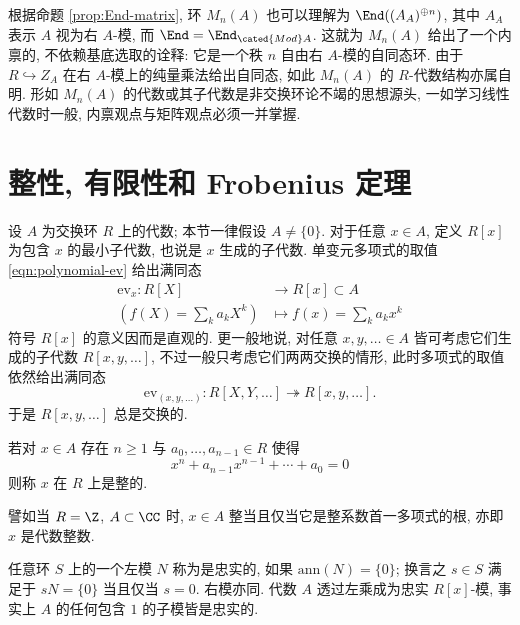 根据命题 \ref{prop:End-matrix}, 环 $M_n(A)$ 也可以理解为 $\End((A_A)^{\oplus n})$, 其中 $A_A$ 表示 $A$ 视为右 $A$-模, 而 $\End = \End_{\cated{Mod}A}$. 这就为 $M_n(A)$ 给出了一个内禀的, 不依赖基底选取的诠释: 它是一个秩 $n$ 自由右 $A$-模的自同态环. 由于 $R \hookrightarrow Z_A$ 在右 $A$-模上的纯量乘法给出自同态, 如此 $M_n(A)$ 的 $R$-代数结构亦属自明. 形如 $M_n(A)$ 的代数或其子代数是非交换环论不竭的思想源头, 一如学习线性代数时一般, 内禀观点与矩阵观点必须一并掌握.

\section{整性, 有限性和 Frobenius 定理}\label{sec:integrality-finiteness}
设 $A$ 为交换环 $R$ 上的代数; 本节一律假设 $A \neq \{0\}$. 对于任意 $x \in A$, 定义 $R[x]$ 为包含 $x$ 的最小子代数, 也说是 $x$ 生成的子代数. 单变元多项式的取值 \eqref{eqn:polynomial-ev} 给出满同态 
\begin{align*}
	\text{ev}_x: R[X] & \longrightarrow R[x] \subset A \\
	\left( f(X) = \sum_k a_k X^k \right) & \longmapsto f(x) = \sum_k a_k x^k 
\end{align*}
符号 $R[x]$ 的意义因而是直观的. 更一般地说, 对任意 $x,y, \ldots \in A$ 皆可考虑它们生成的子代数 $R[x,y, \ldots]$, 不过一般只考虑它们两两交换的情形, 此时多项式的取值依然给出满同态
\[ \text{ev}_{(x,y, \ldots)}: R[X, Y, \ldots] \twoheadrightarrow R[x,y,\ldots]. \]
于是 $R[x,y, \ldots]$ 总是交换的.

\begin{definition}[整性]\label{def:integrality}
	若对 $x \in A$ 存在 $n \geq 1$ 与 $a_0, \ldots, a_{n-1} \in R$ 使得
	\begin{equation}\label{eqn:integrality}
		x^n + a_{n-1} x^{n-1} + \cdots + a_0 = 0
	\end{equation}
	则称 $x$ 在 $R$ 上是整的.
\end{definition}
譬如当 $R=\Z$, $A \subset \CC$ 时, $x \in A$ 整当且仅当它是整系数首一多项式的根, 亦即 $x$ 是代数整数.

任意环 $S$ 上的一个左模 $N$ 称为是忠实的, 如果 $\text{ann}(N) = \{0\}$; 换言之 $s \in S$ 满足于 $sN=\{0\}$ 当且仅当 $s=0$. 右模亦同. 代数 $A$ 透过左乘成为忠实 $R[x]$-模, 事实上 $A$ 的任何包含 $1$ 的子模皆是忠实的.

